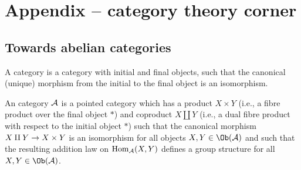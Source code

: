 \documentclass[a4paper,parskip=half,numbers=enddot, DIV=12]{scrreprt}
\begin{document}
\chapter{Appendix -- category theory corner}
\setcounter{thm}{0}
\renewcommand*{\thethm}{\Alph{thm}}
\section{Towards abelian categories}
\begin{defi}
	\begin{alphanumerate}
		\item {}A  category is a category with initial and final objects, such that the canonical (unique) morphism from the initial to the final object is an isomorphism.
		\item An  category $\mathcal{A}$ is a pointed category which has a product $X\times Y$ (i.e., a fibre product over the final object $*$) and coproduct $X\amalg Y$ (i.e., a dual fibre product with respect to the initial object $*$) such that the canonical morphism $X\amalg Y\morphism X\times Y$ is an isomorphism for all objects $X,Y\in\Ob(\Aa)$ and such that the resulting addition law on $\operatorname{Hom}_{\mathcal{A}}(X,Y)$ defines a group structure for all $X,Y\in\Ob(\Aa)$.
	\end{alphanumerate}
\end{defi}
\end{document}
